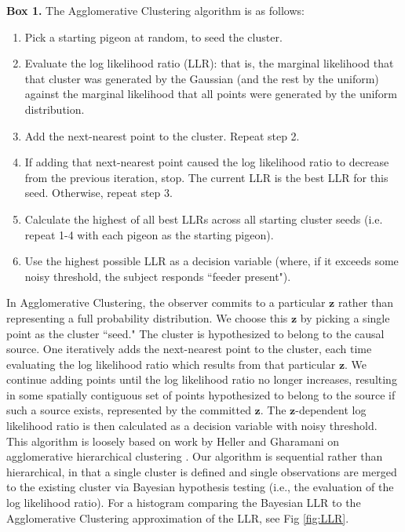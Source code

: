 \documentclass{article}
\begin{document}
\begin{tcolorbox}
{\bf Box 1.} The Agglomerative Clustering algorithm is as follows:
\begin{enumerate}[nolistsep]
    \item Pick a starting pigeon at random, to seed the cluster. 
    \item Evaluate the log likelihood ratio (LLR): that is, the marginal likelihood that that cluster was generated by the Gaussian (and the rest by the uniform) against the marginal likelihood that all points were generated by the uniform distribution.
    \item Add the next-nearest point to the cluster. Repeat step 2. 
    \item If adding that next-nearest point caused the log likelihood ratio to decrease from the previous iteration, stop. The current LLR is the best LLR for this seed. Otherwise, repeat step 3.
    \item Calculate the highest of all best LLRs across all starting cluster seeds (i.e. repeat 1-4 with each pigeon as the starting pigeon).
    \item Use the highest possible LLR as a decision variable (where, if it exceeds some noisy threshold, the subject responds ``feeder present").
\end{enumerate}
\end{tcolorbox}

In Agglomerative Clustering, the observer commits to a particular $\mathbf{z}$ rather than representing a full probability distribution. We choose this $\mathbf{z}$ by picking a single point as the cluster ``seed." The cluster is hypothesized to belong to the causal source. One iteratively adds the next-nearest point to the cluster, each time evaluating the log likelihood ratio which results from that particular $\mathbf{z}$. We continue adding points until the log likelihood ratio no longer increases, resulting in some spatially contiguous set of points hypothesized to belong to the source if such a source exists, represented by the committed $\mathbf{z}$. The $\mathbf{z}$-dependent log likelihood ratio is then calculated as a decision variable with noisy threshold. This algorithm is loosely based on work by Heller and Gharamani on agglomerative hierarchical clustering \cite{heller2005bayesian}. Our algorithm is sequential rather than hierarchical, in that a single cluster is defined and single observations are merged to the existing cluster via Bayesian hypothesis testing (i.e., the evaluation of the log likelihood ratio). For a histogram comparing the Bayesian LLR to the Agglomerative Clustering approximation of the LLR, see Fig \ref{fig:LLR}.
\end{document}
